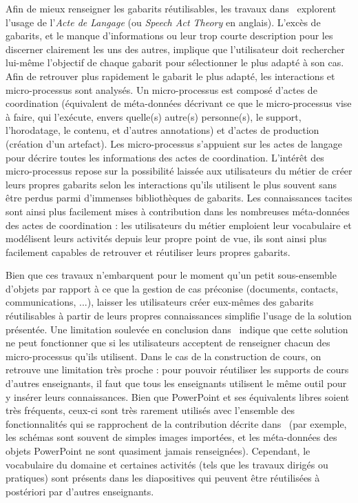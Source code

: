 \bigskip

Afin de mieux renseigner les gabarits réutilisables, les travaux dans~\cite{tenschert2016supporting} explorent l'usage de l'\textit{Acte de Langage} (ou \textit{Speech Act Theory} en anglais).
L'excès de gabarits, et le manque d'informations ou leur trop courte description pour les discerner clairement les uns des autres, implique que l'utilisateur doit rechercher lui-même l'objectif de chaque gabarit pour sélectionner le plus adapté à son cas.
Afin de retrouver plus rapidement le gabarit le plus adapté, les interactions et micro-processus sont analysés.
Un micro-processus est composé d'actes de coordination (équivalent de méta-données décrivant ce que le micro-processus vise à faire, qui l'exécute, envers quelle(s) autre(s) personne(s), le support, l'horodatage, le contenu, et d'autres annotations) et d'actes de production (création d'un artefact).
Les micro-processus s'appuient sur les actes de langage pour décrire toutes les informations des actes de coordination.
L'intérêt des micro-processus repose sur la possibilité laissée aux utilisateurs du métier de créer leurs propres gabarits selon les interactions qu'ils utilisent le plus souvent sans être perdus parmi d'immenses bibliothèques de gabarits.
Les connaissances tacites sont ainsi plus facilement mises à contribution dans les nombreuses méta-données des actes de coordination : les utilisateurs du métier emploient leur vocabulaire et modélisent leurs activités depuis leur propre point de vue, ils sont ainsi plus facilement capables de retrouver et réutiliser leurs propres gabarits.

Bien que ces travaux n'embarquent pour le moment qu'un petit sous-ensemble d'objets par rapport à ce que la gestion de cas préconise (documents, contacts, communications, ...), laisser les utilisateurs créer eux-mêmes des gabarits réutilisables à partir de leurs propres connaissances simplifie l'usage de la solution présentée.
Une limitation soulevée en conclusion dans~\cite{tenschert2016towards} indique que cette solution ne peut fonctionner que si les utilisateurs acceptent de renseigner chacun des micro-processus qu'ils utilisent.
Dans le cas de la construction de cours, on retrouve une limitation très proche : pour pouvoir réutiliser les supports de cours d'autres enseignants, il faut que tous les enseignants utilisent le même outil pour y insérer leurs connaissances.
Bien que PowerPoint et ses équivalents libres soient très fréquents, ceux-ci sont très rarement utilisés avec l'ensemble des fonctionnalités qui se rapprochent de la contribution décrite dans~\cite{tenschert2016supporting} (par exemple, les schémas sont souvent de simples images importées, et les méta-données des objets PowerPoint ne sont quasiment jamais renseignées).
Cependant, le vocabulaire du domaine et certaines activités (tels que les travaux dirigés ou pratiques) sont présents dans les diapositives qui peuvent être réutilisées à postériori par d'autres enseignants.

